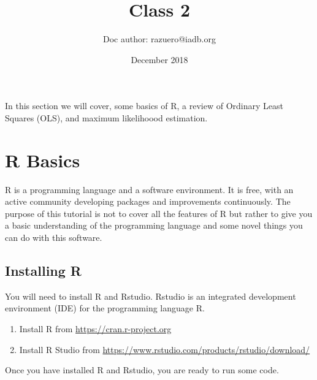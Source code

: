 \documentclass{article}
\title{Class 2}
\author{Doc author: razuero@iadb.org}
\date{December 2018}
\begin{document}
\maketitle
In this section we will cover, some basics of R, a review of Ordinary Least Squares (OLS), and maximum likelihoood estimation.



\section{R Basics}
R is a programming language and a software environment. It is free, with an active community developing packages and improvements continuously. The purpose of this tutorial is not to cover all the features of R but rather to give you a basic understanding of the programming language and some novel things you can do with this software. 
\subsection{Installing R}
You will need to install R and Rstudio. Rstudio is an integrated development environment (IDE) for the programming language R. 
\begin{enumerate}
    \item Install R from \href{https://cran.r-project.org/}{https://cran.r-project.org}
    \item Install R Studio from \href{https://www.rstudio.com/products/rstudio/download/}{https://www.rstudio.com/products/rstudio/download/}
\end{enumerate}
Once you have installed R and Rstudio, you are ready to run some code. 
\end{document}
